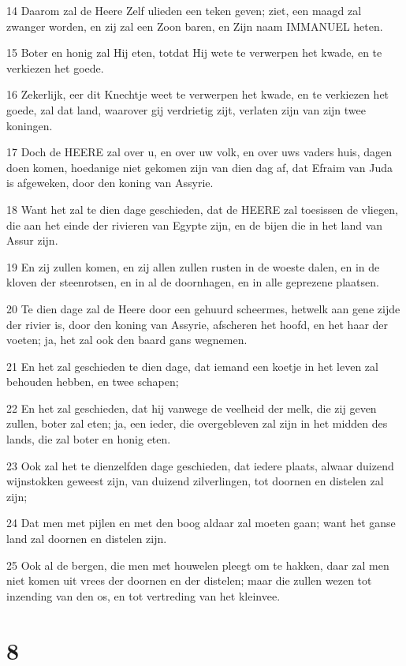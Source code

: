 \par 14 Daarom zal de Heere Zelf ulieden een teken geven; ziet, een maagd zal zwanger worden, en zij zal een Zoon baren, en Zijn naam IMMANUEL heten.
\par 15 Boter en honig zal Hij eten, totdat Hij wete te verwerpen het kwade, en te verkiezen het goede.
\par 16 Zekerlijk, eer dit Knechtje weet te verwerpen het kwade, en te verkiezen het goede, zal dat land, waarover gij verdrietig zijt, verlaten zijn van zijn twee koningen.
\par 17 Doch de HEERE zal over u, en over uw volk, en over uws vaders huis, dagen doen komen, hoedanige niet gekomen zijn van dien dag af, dat Efraim van Juda is afgeweken, door den koning van Assyrie.
\par 18 Want het zal te dien dage geschieden, dat de HEERE zal toesissen de vliegen, die aan het einde der rivieren van Egypte zijn, en de bijen die in het land van Assur zijn.
\par 19 En zij zullen komen, en zij allen zullen rusten in de woeste dalen, en in de kloven der steenrotsen, en in al de doornhagen, en in alle geprezene plaatsen.
\par 20 Te dien dage zal de Heere door een gehuurd scheermes, hetwelk aan gene zijde der rivier is, door den koning van Assyrie, afscheren het hoofd, en het haar der voeten; ja, het zal ook den baard gans wegnemen.
\par 21 En het zal geschieden te dien dage, dat iemand een koetje in het leven zal behouden hebben, en twee schapen;
\par 22 En het zal geschieden, dat hij vanwege de veelheid der melk, die zij geven zullen, boter zal eten; ja, een ieder, die overgebleven zal zijn in het midden des lands, die zal boter en honig eten.
\par 23 Ook zal het te dienzelfden dage geschieden, dat iedere plaats, alwaar duizend wijnstokken geweest zijn, van duizend zilverlingen, tot doornen en distelen zal zijn;
\par 24 Dat men met pijlen en met den boog aldaar zal moeten gaan; want het ganse land zal doornen en distelen zijn.
\par 25 Ook al de bergen, die men met houwelen pleegt om te hakken, daar zal men niet komen uit vrees der doornen en der distelen; maar die zullen wezen tot inzending van den os, en tot vertreding van het kleinvee.

\chapter{8}

